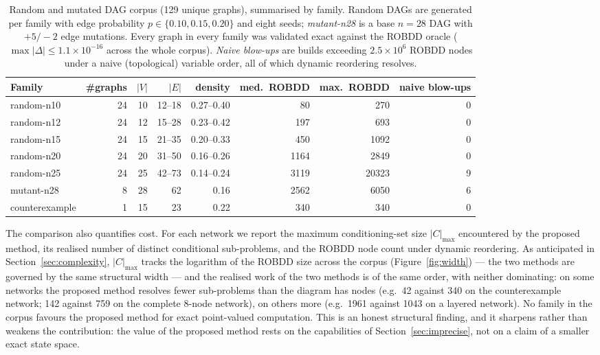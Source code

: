 \documentclass[preprint,12pt]{elsarticle}
\theoremstyle{definition}
\begin{document}
\begin{table}[t]
\centering\small
\caption{Random and mutated DAG corpus (129 unique graphs), summarised by family. Random DAGs are
generated per family with edge probability $p\in\{0.10,0.15,0.20\}$ and eight seeds; \emph{mutant-n28}
is a base $n{=}28$ DAG with $+5/-2$ edge mutations. Every graph in every family was validated exact
against the ROBDD oracle ($\max|\Delta|\le1.1\times10^{-16}$ across the whole corpus).
\emph{Naive blow-ups} are builds exceeding $2.5\times10^{6}$ ROBDD nodes under a naive (topological)
variable order, all of which dynamic reordering resolves.}
\label{tab:corpus}
\begin{tabular}{lrrrrrrr}
\toprule
Family & \#graphs & $|V|$ & $|E|$ & density & med.\ ROBDD & max.\ ROBDD & naive blow-ups\\
\midrule
random-n10  & 24 & 10 & 12--18 & 0.27--0.40 &   80 &   270 & 0\\
random-n12  & 24 & 12 & 15--28 & 0.23--0.42 &  197 &   693 & 0\\
random-n15  & 24 & 15 & 21--35 & 0.20--0.33 &  450 &  1092 & 0\\
random-n20  & 24 & 20 & 31--50 & 0.16--0.26 & 1164 &  2849 & 0\\
random-n25  & 24 & 25 & 42--73 & 0.14--0.24 & 3119 & 20323 & 9\\
mutant-n28  &  8 & 28 & 62     & 0.16       & 2562 &  6050 & 6\\
counterexample & 1 & 15 & 23   & 0.22       &  340 &   340 & 0\\
\bottomrule
\end{tabular}
\end{table}

The comparison also quantifies cost. For each network we report the maximum conditioning-set size
$|C|_{\max}$ encountered by the proposed method, its realised number of distinct conditional
sub-problems, and the ROBDD node count under dynamic reordering. As anticipated in
Section~\ref{sec:complexity}, $|C|_{\max}$ tracks the logarithm of the ROBDD size across the corpus
(Figure~\ref{fig:width}) --- the two methods are governed by the same structural width --- and the
realised work of the two methods is of the same order, with neither dominating: on some networks the
proposed method resolves fewer sub-problems than the diagram has nodes (e.g.\ 42 against 340 on the
counterexample network; 142 against 759 on the complete 8-node network), on others more (e.g.\ 1961
against 1043 on a layered network). No family in the corpus favours the proposed method for exact
point-valued computation. This is an honest structural finding, and it sharpens rather than weakens the
contribution: the value of the proposed method rests on the capabilities of
Section~\ref{sec:imprecise}, not on a claim of a smaller exact state space.
\end{document}
